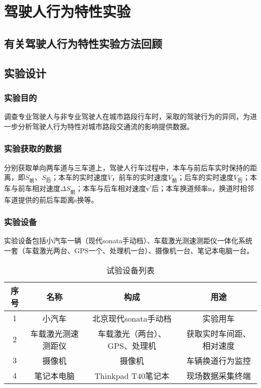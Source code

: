 \chapter{驾驶人行为特性实验}






\section{有关驾驶人行为特性实验方法回顾}


\section{实验设计}
\subsection{实验目的}

调查专业驾驶人与非专业驾驶人在城市路段行车时，采取的驾驶行为的异同，为进一步分析驾驶人行为特性对城市路段交通流的影响提供数据。

\subsection{实验获取的数据}
分别获取单向两车道与三车道上，驾驶人行车过程中，本车与前后车实时保持的距离，即$S_{\text{前}}$、$S_{\text{后}}$；本车的实时速度$V$，前车的实时速度$V_{\text{前}}$；后车的实时速度$V_{\text{后}}$；本车与前车相对速度${\Delta}S_{\text{前}}$；本车与后车相对速度v’后；本车换道频率n，换道时相邻车道提供的前后车距离s换等。


\subsection{实验设备}
实验设备包括小汽车一辆（现代sonata手动档）、车载激光测速测距仪一体化系统一套（车载激光两台、GPS一个、处理机一台）、摄像机一台、笔记本电脑一台。
\begin{table}[htbp]
 \centering
 \caption{试验设备列表}
 \begin{tabular}{cccc}
   \addlinespace
    \toprule
    序号 & 名称  & 构成 & 用途 \\
    \midrule
	1 & 小汽车 & 北京现代sonata手动档 & 实验用车 \\
	2 & 车载激光测速测距仪 & 车载激光（两台）、GPS、处理机 & 获取实时车间距、相对速度 \\
	3 & 摄像机 & 摄像机 & 车辆换道行为监控 \\
	4 & 笔记本电脑 & Thinkpad T40笔记本 & 现场数据采集终端 \\
    \bottomrule
    \end{tabular}
  \label{equipment}
\end{table}

